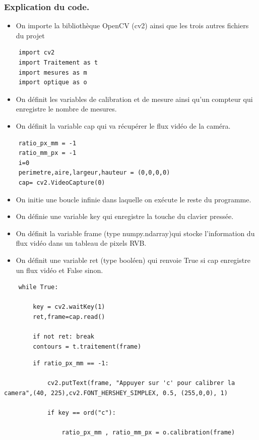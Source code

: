 \documentclass[titlepage]{article}
\begin{document}
	\subsubsection{Explication du code.}
	\begin{itemize}
	\item 
	On importe la bibliothèque OpenCV (cv2) ainsi que les trois autres fichiers du projet
	\end{itemize}
	\begin{lstlisting}
	import cv2 
	import Traitement as t
	import mesures as m
	import optique as o
	\end{lstlisting}
	\begin{itemize}
		\item
		On définit les variables de calibration et de mesure ainsi qu'un compteur qui enregistre le nombre de mesures.
		\item
		On définit la variable cap qui va récupérer le flux vidéo de la caméra.
	\end{itemize}
	\begin{lstlisting}
	ratio_px_mm = -1
	ratio_mm_px = -1
	i=0
	perimetre,aire,largeur,hauteur = (0,0,0,0)
	cap= cv2.VideoCapture(0)
	\end{lstlisting}
	\begin{itemize}
		\item
		On initie une boucle infinie dans laquelle on exécute le reste du programme.
		\item
		On définie une variable key qui enregistre la touche du clavier pressée.
		\item
		On définit la variable frame (type numpy.ndarray)qui stocke l'information du flux vidéo dans un tableau de pixels RVB.
		\item
		On définit une variable ret (type booléen) qui renvoie True si cap enregistre un flux vidéo et False sinon.
	\end{itemize}
	\begin{lstlisting}
	while True: 
	
		key = cv2.waitKey(1)
		ret,frame=cap.read()
		
		if not ret: break  
		contours = t.traitement(frame)
	\end{lstlisting}
	\begin{lstlisting}
		if ratio_px_mm == -1:
		
			cv2.putText(frame, "Appuyer sur 'c' pour calibrer la camera",(40, 225),cv2.FONT_HERSHEY_SIMPLEX, 0.5, (255,0,0), 1)
			
			if key == ord("c"):
			
				ratio_px_mm , ratio_mm_px = o.calibration(frame)
	\end{lstlisting}
\end{document}
